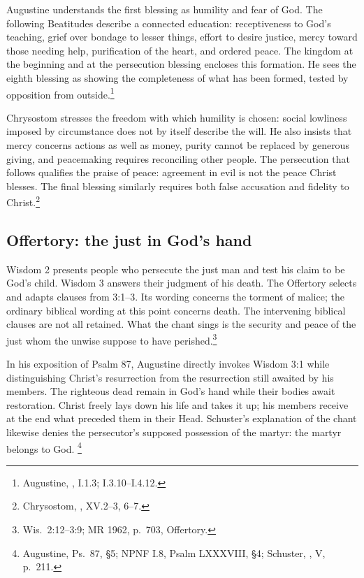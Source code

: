 Augustine understands the first blessing as humility and fear of God. The
following Beatitudes describe a connected education: receptiveness to God's
teaching, grief over bondage to lesser things, effort to desire justice,
mercy toward those needing help, purification of the heart, and ordered peace.
The kingdom at the beginning and at the persecution blessing encloses this
formation. He sees the eighth blessing as showing the completeness of what
has been formed, tested by opposition from outside.\footnote{Augustine,
, I.1.3; I.3.10--I.4.12.}

Chrysostom stresses the freedom with which humility is chosen: social
lowliness imposed by circumstance does not by itself describe the will.
He also insists that mercy concerns actions as well as money, purity cannot
be replaced by generous giving, and peacemaking requires reconciling other
people. The persecution that follows qualifies the praise of peace: agreement
in evil is not the peace Christ blesses. The final blessing similarly
requires both false accusation and fidelity to Christ.\footnote{Chrysostom,
, XV.2--3, 6--7.}

\subsection{Offertory: the just in God's hand}
Wisdom 2 presents people who persecute the just man and test his claim to
be God's child. Wisdom 3 answers their judgment of his death. The Offertory
selects and adapts clauses from 3:1--3. Its wording concerns the torment
of malice; the ordinary biblical wording at this point concerns death.
The intervening biblical clauses are not all retained. What the chant
sings is the security and peace of the just whom the unwise suppose
to have perished.\footnote{Wis.~2:12--3:9; MR 1962, p.~703, Offertory.}

In his exposition of Psalm 87, Augustine directly invokes Wisdom 3:1 while
distinguishing Christ's resurrection from the resurrection still awaited by
his members. The righteous dead remain in God's hand while their bodies
await restoration. Christ freely lays down his life and takes it up; his
members receive at the end what preceded them in their Head.
Schuster's explanation of the chant likewise denies the persecutor's
supposed possession of the martyr: the martyr belongs to God.
\footnote{Augustine, Ps.~87, \S5; NPNF I.8, Psalm LXXXVIII, \S4;
Schuster, , V, p.~211.}

